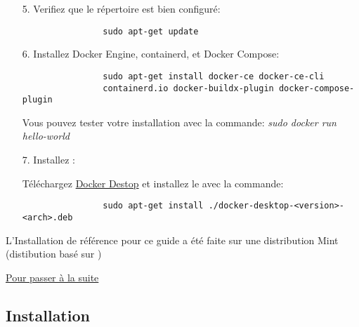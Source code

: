 \begin{itemize}
        \item[5.] Verifiez que le répertoire est bien configuré:

            \begin{lstlisting}
                sudo apt-get update
            \end{lstlisting}    

        \item[6.] Installez Docker Engine, containerd, et Docker Compose:

            \begin{lstlisting}
                sudo apt-get install docker-ce docker-ce-cli 
                containerd.io docker-buildx-plugin docker-compose-plugin
            \end{lstlisting}
            \begin{footnotesize}
                Vous pouvez tester votre installation avec la commande: \textit{sudo docker run hello-world}
            \end{footnotesize}

            \bigskip
        \item[7.] Installez \dockerdesktop{}:

        
            \begin{footnotesize}
                Téléchargez \href{https://desktop.docker.com/linux/main/amd64/docker-desktop-4.17.0-amd64.deb?utm_source=docker&utm_medium=webreferral&utm_campaign=docs-driven-download-linux-amd64}{Docker Destop} et installez le avec la commande:
            \end{footnotesize}

            \begin{lstlisting}
                sudo apt-get install ./docker-desktop-<version>-<arch>.deb
            \end{lstlisting}

    \end{itemize}

    \bigskip

    \begin{footnotesize}
        L'Installation de référence pour ce guide a été faite sur une distribution \linux{} Mint (distibution basé sur \ubuntu{})\\
    \end{footnotesize}

    \hyperref[sec:suite_installation]{Pour passer à la suite}

\newpage

\subsection[Installation Windows]{Installation \windows{}\label{sec:installation_windows}}

